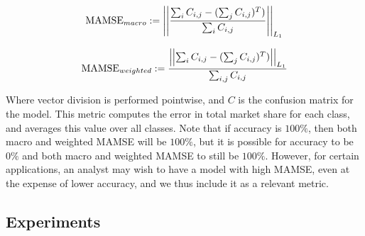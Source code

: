 \documentclass[conference]{IEEEtran}
\begin{document}
$$ \text{MAMSE}_{\mbox{\footnotesize macro}} := \left| \left| \frac{\sum_i C_{i,j} - (\sum_j C_{i,j})^T)}{\sum_i C_{i,j}} \right| \right|_{L_1} $$

$$ \text{MAMSE}_{\mbox{\footnotesize weighted}} := \frac{ \left| \left| \sum_i C_{i,j} - (\sum_j C_{i,j})^T) \right| \right|_{L_1}} {\sum_{i,j} C_{i,j}} $$

Where vector division is performed pointwise, and $C$ is the confusion matrix for the model.
 This metric computes the error in total market share for each class, and averages this value over all classes.
 Note that if accuracy is $100\%$, then both macro and weighted MAMSE will be $100\%$, but it is possible for accuracy to be $0\%$ and both macro and weighted MAMSE to still be $100\%$.
 However, for certain applications, an analyst may wish to have a model with high MAMSE, even at the expense of lower accuracy, and we thus include it as a relevant metric.
 

\subsection{Experiments} \label{subsection:experiments}
\end{document}
